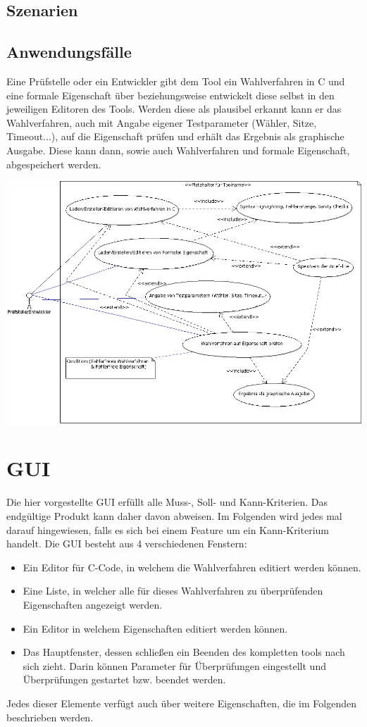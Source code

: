\documentclass[a4paper]{scrreprt}
\begin{document}
\section{Szenarien}
\section{Anwendungsfälle}
Eine Prüfstelle oder ein Entwickler gibt dem Tool ein Wahlverfahren in C und eine formale 
Eigenschaft über beziehungsweise entwickelt diese selbst in den jeweiligen Editoren des Tools. 
Werden diese als plausibel erkannt kann er das Wahlverfahren, auch mit Angabe eigener 
Testparameter (Wähler, Sitze, Timeout...), auf die Eigenschaft prüfen und erhält das Ergebnis 
als graphische Ausgabe. 
Diese kann dann, sowie auch Wahlverfahren und formale Eigenschaft, abgespeichert werden.


{\vspace{0.5cm}\hspace*{-3cm}\includegraphics[scale=0.49]{Use-Case-Diagram}}
	


\chapter{GUI}
Die hier vorgestellte \ac{GUI} erfüllt alle Muss-, Soll- und Kann-Kriterien. Das endgültige Produkt kann daher davon abweisen. Im Folgenden wird jedes mal darauf hingewiesen, falls es sich bei einem Feature um ein Kann-Kriterium handelt.
Die \ac{GUI} besteht aus 4 verschiedenen Fenstern: 
\begin{itemize}
\item Ein Editor für C-Code, in welchem die Wahlverfahren editiert werden können.
\item Eine Liste, in welcher alle für dieses Wahlverfahren zu überprüfenden Eigenschaften angezeigt werden.
\item Ein Editor in welchem Eigenschaften editiert werden können.
\item Das Hauptfenster, dessen schließen ein Beenden des kompletten tools nach sich zieht. Darin können Parameter für Überprüfungen eingestellt und Überprüfungen gestartet bzw. beendet werden.
\end{itemize}
Jedes dieser Elemente verfügt auch über weitere Eigenschaften, die im Folgenden beschrieben werden.
\end{document}
